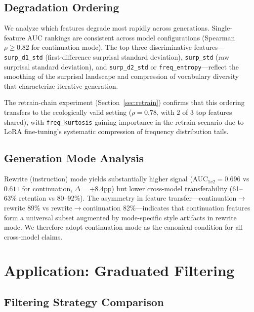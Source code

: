 \documentclass[11pt,a4paper]{article}
\begin{document}
\subsection{Degradation Ordering}
\label{sec:degradation}

We analyze which features degrade most rapidly across generations.
Single-feature AUC rankings are consistent across model configurations (Spearman $\rho \geq 0.82$ for continuation mode).
The top three discriminative features---\texttt{surp\_d1\_std} (first-difference surprisal standard deviation), \texttt{surp\_std} (raw surprisal standard deviation), and \texttt{surp\_d2\_std} or \texttt{freq\_entropy}---reflect the smoothing of the surprisal landscape and compression of vocabulary diversity that characterize iterative generation.

The retrain-chain experiment (Section~\ref{sec:retrain}) confirms that this ordering transfers to the ecologically valid setting ($\rho = 0.78$, with 2 of 3 top features shared), with \texttt{freq\_kurtosis} gaining importance in the retrain scenario due to LoRA fine-tuning's systematic compression of frequency distribution tails.

\subsection{Generation Mode Analysis}
\label{sec:genmode}

Rewrite (instruction) mode yields substantially higher signal (AUC$_{1v2} = 0.696$ vs $0.611$ for continuation, $\Delta = +8.4$pp) but lower cross-model transferability (61--63\% retention vs 80--92\%).
The asymmetry in feature transfer---continuation$\to$rewrite 89\% vs rewrite$\to$continuation 82\%---indicates that continuation features form a universal subset augmented by mode-specific style artifacts in rewrite mode.
We therefore adopt continuation mode as the canonical condition for all cross-model claims.

\section{Application: Graduated Filtering}
\label{sec:application}

\subsection{Filtering Strategy Comparison}
\label{sec:filtering}
\end{document}

